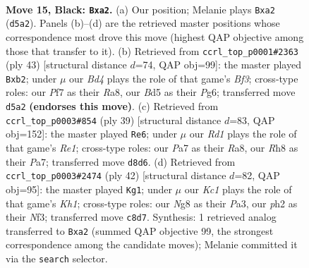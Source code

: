 \documentclass[11pt]{article}
\begin{document}
\clearpage

\begin{figure}[p]\centering
\begin{subfigure}{0.46\textwidth}\centering
\resizebox{\linewidth}{!}{%
\newchessgame
\chessboard[
  setfen={2kr2nr/p1p2ppp/1pp2q2/3b4/8/2P1QP2/PP4PP/2KR1B1R b - - 1 15},
  showmover=false,
  pgfstyle=straightmove, color=movearrow, markmove={d5-a2}
]}
\caption{}
\end{subfigure}\hfill
\begin{subfigure}{0.46\textwidth}\centering
\resizebox{\linewidth}{!}{%
\newchessgame
\chessboard[
  setfen={r2q2k1/2p2r1p/1pp2bp1/p7/P5Q1/3PB2P/1PP3P1/R4RK1 b - - 0 22},
  showmover=false,
  pgfstyle=straightmove, color=movearrow, markmove={f6-b2}
]}
\caption{}
\end{subfigure}
\\[4pt]
\begin{subfigure}{0.46\textwidth}\centering
\resizebox{\linewidth}{!}{%
\newchessgame
\chessboard[
  setfen={r3r1k1/p4pp1/1p3q2/2pbn2p/P6P/2Q2P2/1PPN1BP1/R3R1K1 b - - 1 20},
  showmover=false,
  pgfstyle=straightmove, color=movearrow, markmove={e8-e6}
]}
\caption{}
\end{subfigure}\hfill
\begin{subfigure}{0.46\textwidth}\centering
\resizebox{\linewidth}{!}{%
\newchessgame
\chessboard[
  setfen={r3rbk1/1p3pp1/pq5p/3pB3/b7/P1P2N1P/1P1Q1PP1/R3R2K w - - 0 22},
  showmover=false,
  pgfstyle=straightmove, color=movearrow, markmove={h1-g1}
]}
\caption{}
\end{subfigure}
\caption{\textbf{Move 15, Black: \texttt{Bxa2}.} (a) Our position; Melanie plays \texttt{Bxa2} (\texttt{d5a2}). Panels (b)--(d) are the retrieved master positions whose correspondence most drove this move (highest QAP objective among those that transfer to it). (b) Retrieved from \texttt{ccrl\_top\_p0001\#2363} (ply 43) [structural distance $d$=74, QAP obj=99]: the master played \texttt{Bxb2}; under $\mu$ our \emph{Bd4} plays the role of that game's \emph{Bf3}; cross-type roles: our \emph{P}f7 as their \emph{R}a8, our \emph{B}d5 as their \emph{P}g6; transferred move \texttt{d5a2} \textbf{(endorses this move)}. (c) Retrieved from \texttt{ccrl\_top\_p0003\#854} (ply 39) [structural distance $d$=83, QAP obj=152]: the master played \texttt{Re6}; under $\mu$ our \emph{Rd1} plays the role of that game's \emph{Re1}; cross-type roles: our \emph{P}a7 as their \emph{R}a8, our \emph{R}h8 as their \emph{P}a7; transferred move \texttt{d8d6}. (d) Retrieved from \texttt{ccrl\_top\_p0003\#2474} (ply 42) [structural distance $d$=82, QAP obj=95]: the master played \texttt{Kg1}; under $\mu$ our \emph{Kc1} plays the role of that game's \emph{Kh1}; cross-type roles: our \emph{N}g8 as their \emph{P}a3, our \emph{p}h2 as their \emph{N}f3; transferred move \texttt{c8d7}. Synthesis: 1 retrieved analog transferred to \texttt{Bxa2} (summed QAP objective 99, the strongest correspondence among the candidate moves); Melanie committed it via the \texttt{search} selector.}
\label{fig:thought-m29}
\end{figure}
\end{document}
